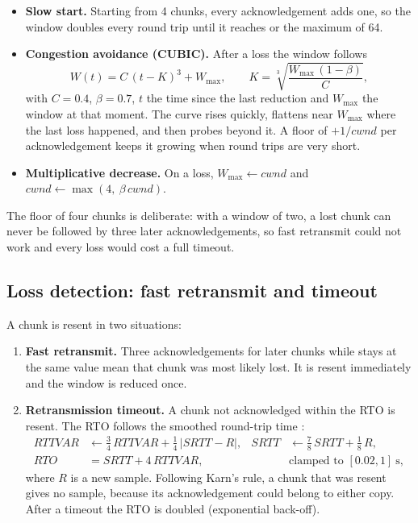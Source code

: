 \begin{itemize}
  \item \textbf{Slow start.} Starting from 4 chunks, every acknowledgement adds one, so the window
        doubles every round trip until it reaches  or the maximum of 64.
  \item \textbf{Congestion avoidance (CUBIC).} After a loss the window follows \cite{rfc8312}
        \begin{equation}
          W(t) = C\,(t-K)^3 + W_{\max}, \qquad K = \sqrt[3]{\frac{W_{\max}\,(1-\beta)}{C}},
        \end{equation}
        with $C = 0.4$, $\beta = 0.7$, $t$ the time since the last reduction and $W_{\max}$ the
        window at that moment. The curve rises quickly, flattens near $W_{\max}$ where the last loss
        happened, and then probes beyond it. A floor of $+1/\textit{cwnd}$ per acknowledgement keeps
        it growing when round trips are very short.
  \item \textbf{Multiplicative decrease.} On a loss, $W_{\max} \gets \textit{cwnd}$ and
        $\textit{cwnd} \gets \max(4,\ \beta\,\textit{cwnd})$.
\end{itemize}

The floor of four chunks is deliberate: with a window of two, a lost chunk can never be followed by
three later acknowledgements, so fast retransmit could not work and every loss would cost a full
timeout.


\subsection{Loss detection: fast retransmit and timeout}
A chunk is resent in two situations:

\begin{enumerate}
  \item \textbf{Fast retransmit.} Three acknowledgements for later chunks while  stays at
        the same value mean that chunk  was most likely lost. It is resent immediately
        and the window is reduced once.
  \item \textbf{Retransmission timeout.} A chunk not acknowledged within the RTO is resent. The RTO
        follows the smoothed round-trip time \cite{rfc6298}:
        \begin{align}
          \textit{RTTVAR} &\gets \tfrac{3}{4}\,\textit{RTTVAR} + \tfrac{1}{4}\,|\textit{SRTT} - R|, &
          \textit{SRTT} &\gets \tfrac{7}{8}\,\textit{SRTT} + \tfrac{1}{8}\,R, \\
          \textit{RTO} &= \textit{SRTT} + 4\,\textit{RTTVAR}, & & \text{clamped to } [0.02, 1]\ \text{s},
        \end{align}
        where $R$ is a new sample. Following Karn's rule, a chunk that was resent gives no sample,
        because its acknowledgement could belong to either copy. After a timeout the RTO is doubled
        (exponential back-off).
\end{enumerate}

